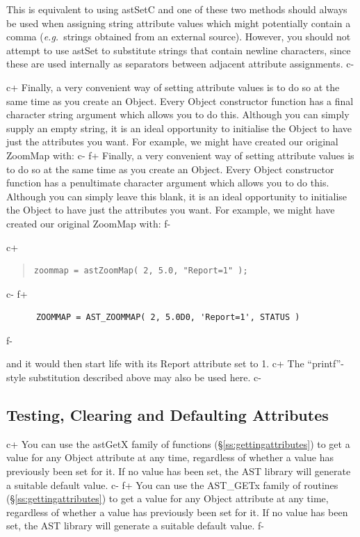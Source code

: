 \documentclass[twoside,11pt]{article}
\newcommand{\secref}[1]{\S\ref{#1}}
\newcommand{\secref}[1]{\ref{#1}}
\begin{document}
This is equivalent to using astSetC and one of these two methods
should always be used when assigning string attribute values which
might potentially contain a comma ({\em{e.g.}}\ strings obtained from
an external source). However, you should not attempt to use astSet to
substitute strings that contain newline characters, since these are
used internally as separators between adjacent attribute assignments.
c-
\label{ss:attributeinitialisation}

c+
Finally, a very convenient way of setting attribute values is to do so
at the same time as you create an Object. Every Object constructor
function has a final character string argument which allows you to do
this. Although you can simply supply an empty string, it is an ideal
opportunity to initialise the Object to have just the attributes you
want. For example, we might have created our original ZoomMap with:
c-
f+
Finally, a very convenient way of setting attribute values is to do so
at the same time as you create an Object. Every Object constructor
function has a penultimate character argument which allows you to do
this. Although you can simply leave this blank, it is an ideal
opportunity to initialise the Object to have just the attributes you
want. For example, we might have created our original ZoomMap with:
f-

c+
\begin{quote}
\small
\begin{verbatim}
zoommap = astZoomMap( 2, 5.0, "Report=1" );
\end{verbatim}
\normalsize
\end{quote}
c-
f+
\small
\begin{verbatim}
      ZOOMMAP = AST_ZOOMMAP( 2, 5.0D0, 'Report=1', STATUS )
\end{verbatim}
\normalsize
f-

and it would then start life with its Report attribute set to 1.
c+
The ``printf''-style substitution described above may also be used
here.
c-

\subsection{\label{ss:defaultingattributes}Testing, Clearing and Defaulting Attributes}

c+
You can use the astGetX family of functions
(\secref{ss:gettingattributes}) to get a value for any Object attribute
at any time, regardless of whether a value has previously been set for
it. If no value has been set, the AST library will generate a suitable
default value.
c-
f+
You can use the AST\_GETx family of routines
(\secref{ss:gettingattributes}) to get a value for any Object attribute
at any time, regardless of whether a value has previously been set for
it. If no value has been set, the AST library will generate a suitable
default value.
f-
\end{document}
